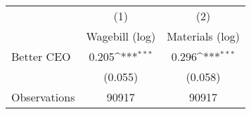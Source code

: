 {
\def\sym#1{\ifmmode^{#1}\else\(^{#1}\)\fi}
\begin{tabular}{l*{2}{c}}
\hline\hline
                    &\multicolumn{1}{c}{(1)}&\multicolumn{1}{c}{(2)}\\
                    &\multicolumn{1}{c}{Wagebill (log)}&\multicolumn{1}{c}{Materials (log)}\\
\hline
Better CEO          &       0.205\sym{***}&       0.296\sym{***}\\
                    &     (0.055)         &     (0.058)         \\
\hline
Observations        &       90917         &       90917         \\
\hline\hline
\end{tabular}
}
